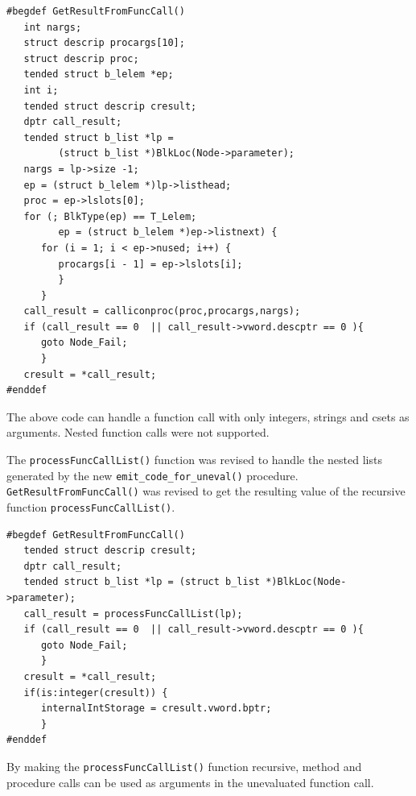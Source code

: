 \documentclass{article}
\begin{document}
\begin{verbatim}
#begdef GetResultFromFuncCall()
   int nargs;
   struct descrip procargs[10];
   struct descrip proc;
   tended struct b_lelem *ep;
   int i;
   tended struct descrip cresult;
   dptr call_result;
   tended struct b_list *lp = 
         (struct b_list *)BlkLoc(Node->parameter);
   nargs = lp->size -1;
   ep = (struct b_lelem *)lp->listhead;
   proc = ep->lslots[0];
   for (; BlkType(ep) == T_Lelem; 
         ep = (struct b_lelem *)ep->listnext) {
      for (i = 1; i < ep->nused; i++) {
         procargs[i - 1] = ep->lslots[i];
         }
      }
   call_result = calliconproc(proc,procargs,nargs);
   if (call_result == 0  || call_result->vword.descptr == 0 ){
      goto Node_Fail;
      }
   cresult = *call_result;
#enddef
\end{verbatim}
The above code can handle a function call with only integers, strings and csets as arguments.  Nested function calls were not supported. 

The \texttt{processFuncCallList()} function was revised to handle the nested lists generated by the new \texttt{emit\_code\_for\_uneval()} procedure.  \texttt{GetResultFromFuncCall()} was revised to get the resulting value of the recursive function \texttt{processFuncCallList()}.\\ 
\begin{verbatim}
#begdef GetResultFromFuncCall()
   tended struct descrip cresult;
   dptr call_result;
   tended struct b_list *lp = (struct b_list *)BlkLoc(Node->parameter);
   call_result = processFuncCallList(lp);
   if (call_result == 0  || call_result->vword.descptr == 0 ){
      goto Node_Fail;
      }
   cresult = *call_result;
   if(is:integer(cresult)) {
      internalIntStorage = cresult.vword.bptr;
      }
#enddef
\end{verbatim}
By making the \texttt{processFuncCallList()} function recursive, method and procedure calls can be used as arguments in the unevaluated function call.\\
\end{document}
